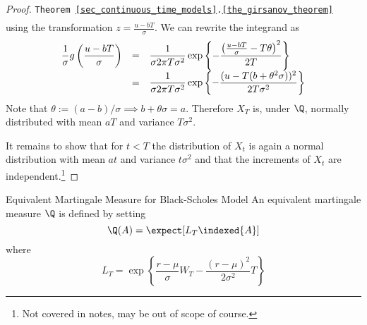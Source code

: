 \documentclass[11pt,a4paper]{article}
\begin{document}
\begin{proof}{\texttt{Theorem \ref{sec_continuous_time_models}.\ref{the_girsanov_theorem}}}
\[\begin{array}{rcl}
    \end{array}\]
    using the transformation $z=\frac{u-bT}\sigma$.
    We can rewrite the integrand as
    \[\everymath={\displaystyle}\begin{array}{rcl}
      \frac1\sigma g\left(\frac{u-bT}\sigma\right)&=&\frac1{\sigma{2\pi T\sigma^2}}\exp\left\{-\frac{\left(\frac{u-bT}\sigma-T\theta\right)^2}{2T}\right\}\\
      &=&\frac1{\sigma{2\pi T\sigma^2}}\exp\left\{-\frac{(u-T(b+\theta^2\sigma))^2}{2T\sigma^2}\right\}\\
    \end{array}\]
    Note that $\theta:=(a-b)/\sigma\implies b+\theta\sigma=a$. Therefore $X_T$ is, under $\Q$, normally distributed with mean $aT$ and variance $T\sigma^2$.
    \par It remains to show that for $t<T$ the distribution of $X_t$ is again a normal distribution with mean $at$ and variance $t\sigma^2$ and that the increments of $X_t$ are independent.\footnote{Not covered in notes, may be out of scope of course.}\proved
  \end{proof}

  \begin{proposition}{Equivalent Martingale Measure for Black-Scholes Model}\label{prop_equivalent_martingale_measure_for_bs_model}
    An equivalent martingale measure $\Q$ is defined by setting
    \[ \Q(A)=\expect[L_T\indexed\{A\}] \]
    where
    \[ L_T=\exp\left\{\frac{r-\mu}\sigma W_T-\frac{(r-\mu)^2}{2\sigma^2}T\right\} \]
  \end{proposition}
\end{document}
